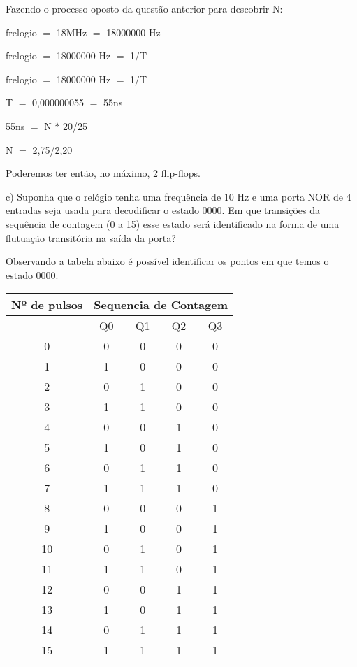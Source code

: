 \documentclass[12pt]{article}
\begin{document}
		
		Fazendo o processo oposto da questão anterior para descobrir N:
		
		
		frelogio $=$ 18MHz $=$ 18000000 Hz
		
		frelogio $=$ 18000000 Hz $=$ 1/T
		
		frelogio $=$ 18000000 Hz $=$ 1/T
		
		T $=$ 0,000000055 $=$ 55ns
		
		55ns $=$ N $*$ 20/25
		
		N $=$ 2,75/2,20
		
		
		Poderemos ter então, no máximo, 2 flip-flops.
		
	\begin{flushleft}
		c)	Suponha que o relógio tenha uma frequência de 10 Hz e uma porta NOR de 4 entradas seja
		usada para decodificar o estado 0000. Em que transições da sequência de contagem (0 a 15)
		esse estado será identificado na forma de uma flutuação transitória na saída da porta?
	\end{flushleft} 
	
	Observando a tabela abaixo é possível identificar os pontos em que temos o estado 0000.
	
	\begin{table}[H]
		\centering
		\begin{tabular}{|c|c|c|c|c|}
			\cline{1-5}
			\multicolumn{1}{|c|}{Nº de pulsos} & \multicolumn{4}{|c|}{Sequencia de Contagem} \\
			\hline
			 & Q0 & Q1 & Q2 & Q3 \\
			\hline
			0  & 0 & 0 & 0 & 0 \\
			\hline
			1  & 1 & 0 & 0 & 0 \\
			\hline
			2  & 0 & 1 & 0 & 0 \\
			\hline
			3  & 1 & 1 & 0 & 0 \\
			\hline
			4  & 0 & 0 & 1 & 0 \\
			\hline
			5  & 1 & 0 & 1 & 0 \\
			\hline
			6  & 0 & 1 & 1 & 0 \\
			\hline
			7  & 1 & 1 & 1 & 0 \\
			\hline
			8  & 0 & 0 & 0 & 1 \\
			\hline
			9  & 1 & 0 & 0 & 1 \\
			\hline
			10  & 0 & 1 & 0 & 1 \\
			\hline
			11  & 1 & 1 & 0 & 1 \\
			\hline
			12  & 0 & 0 & 1 & 1 \\
			\hline
			13  & 1 & 0 & 1 & 1 \\
			\hline
			14  & 0 & 1 & 1 & 1 \\
			\hline
			15  & 1 & 1 & 1 & 1 \\
			\hline
		\end{tabular}
	\end{table}
\end{document}
